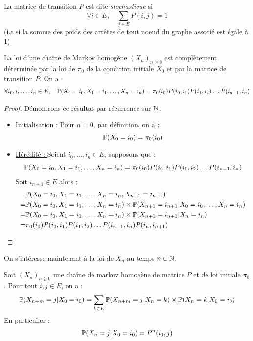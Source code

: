 \begin{definition}
    La matrice de transition $P$ est dite \emph{stochastique} si 
        \[ \forall i \in  E, \quad \sum_{j \in E} P(i,j) = 1 \] 
    (i.e si la somme des poids des arrêtes de tout noeud du graphe associé est égale à 1)
\end{definition}

\begin{proposition}
    La loi d'une chaîne de Markov homogène $(X_n)_{n \geqslant 0}$ est complètement déterminée par la loi de $ \pi_0$ 
    de la condition initiale $X_0$ et par la matrice de transition $P$. On a : 
        \[ \forall i_0, i, \dots, i_n \in E, \quad \mathbb{P}(X_0 = i_0, X_1 = i_1, \dots, X_n = i_n) = \pi_0(i_0)P(i_0, i_1)P(i_1, i_2) \dots P(i_{n-1}, i_n) \] 
\end{proposition}

\begin{proof}
    Démontrons ce résultat par récurrence sur $\mathbb{N}$. 
    \begin{itemize}
        \item \underline{Initialisation : } Pour $n = 0$, par définition, on a : 
            \[ \mathbb{P}(X_0 = i_0) = \pi_0(i_0) \] 
        \item \underline{Hérédité : } Soient $i_0, \dots, i_n \in E$, supposons que : 
            \[ \mathbb{P}(X_0 = i_0, X_1 = i_1, \dots, X_n = i_n) = \pi_0(i_0)P(i_0, i_1)P(i_1, i_2) \dots P(i_{n-1}, i_n) \] 
        Soit $i_{n+1} \in  E$ alors : 
            \begin{align*}
                & \mathbb{P}(X_0 = i_0, X_1 = i_1, \dots, X_n = i_n, X_{n+1} = i_{n+1}) \\
                =& \mathbb{P}(X_0 = i_0, X_1 = i_1, \dots, X_n = i_n) \times \mathbb{P}(X_{n+1} = i_{n+1} | X_0 = i_0, \dots, X_n = i_n ) \\ 
                =& \mathbb{P}(X_0 = i_0, X_1 = i_1, \dots, X_n = i_n) \times \mathbb{P}(X_{n+1} = i_{n+1} | X_n = i_n) \\ 
                =& \pi_0(i_0)P(i_0, i_1)P(i_1, i_2) \dots P(i_{n-1}, i_n) P(i_n, i_{n+1})
            \end{align*}
    \end{itemize}
\end{proof}

On s'intéresse maintenant à la loi de $X_n$ au temps $n \in \mathbb{N}$. 

\begin{prop}
    Soit $(X_n)_{n \geqslant 0}$ une chaîne de markov homogène de matrice $P$ et de loi initiale $ \pi_0$. 
    Pour tout $i,j \in E$, on a : 
        \[ \mathbb{P}(X_{n +m} = j | X_0 = i_0) = \sum_{k \in E} \mathbb{P}(X_{n+m} = j | X_n = k) \times \mathbb{P}(X_n = k | X_0 = i_0) \]
    En particulier : 
        \[ \mathbb{P}(X_n = j | X_0 = i_0) = P^n (i_0, j) \]   
\end{prop}

